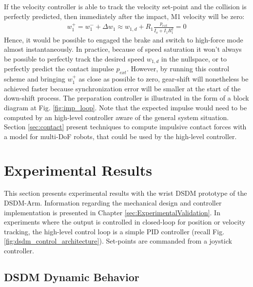If the velocity controller is able to track the velocity set-point and the collision is perfectly predicted, then immediately after the impact, M1 velocity will be zero:
%
\begin{align}
w_1^+ =  w_1^- + \Delta w_1 \approx w_{1,d}  + R_1 \frac{ p_{ext} }{I_o + I_1 R_1^2} = 0
\label{eq:dsdm_impact_vel}
\end{align}
%
Hence, it would be possible to engaged the brake and switch to high-force mode almost instantaneously. In practice, because of speed saturation it won't always be possible to perfectly track the desired speed $w_{1,d}$ in the nullspace, or to perfectly predict the contact impulse $p_{ext}$. However, by running this control scheme and bringing $w_1^+$ as close as possible to zero, gear-shift will nonetheless be achieved faster because synchronization error will be smaller at the start of the down-shift process.
%
The preparation controller is illustrated in the form of a block diagram at Fig. \ref{fig:imp_loop}. Note that the expected impulse would need to be computed by an high-level controller aware of the general system situation. Section \ref{sec:contact} present techniques to compute impulsive contact forces with a model for multi-DoF robots, that could be used by the high-level controller. 




\newpage

\section{Experimental Results}
\label{sec:dsdm_exp}

This section presents experimental results with the wrist DSDM prototype of the DSDM-Arm. Information regarding the mechanical design and controller implementation is presented in Chapter \ref{sec:ExperimentalValidation}. In experiments where the output is controlled in closed-loop for position or velocity tracking, the high-level control loop is a simple PID controller (recall Fig. \ref{fig:dsdm_control_architecture}). Set-points are commanded from a joystick controller. 

\subsection{DSDM Dynamic Behavior}

